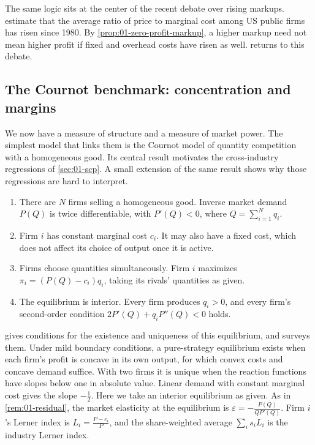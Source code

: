 The same logic sits at the center of the recent debate over rising markups.
\citet{DeLoeckerEeckhoutUnger2020} estimate that the average ratio of price to marginal cost among US public
firms has risen since 1980. By \cref{prop:01-zero-profit-markup}, a higher markup need not mean higher profit if
fixed and overhead costs have risen as well.  returns to this debate.

\subsection{The Cournot benchmark: concentration and margins}\label{sec:01-cournot-hhi}

We now have a measure of structure and a measure of market power. The simplest model that links them is the
Cournot model of quantity competition with a homogeneous good. Its central result motivates the cross-industry
regressions of \cref{sec:01-scp}. A small extension of the same result shows why those regressions are hard to
interpret.

\begin{assumption}\label{ass:01-cournot}
\leavevmode
\begin{enumerate}[label=(\roman*)]
  \item There are $N$ firms selling a homogeneous good. Inverse market demand $P(Q)$ is twice differentiable,
  with $P'(Q) < 0$, where $Q = \sum_{i=1}^{N} q_i$.
  \item Firm $i$ has constant marginal cost $c_i$. It may also have a fixed cost, which does not affect its
  choice of output once it is active.
  \item Firms choose quantities simultaneously. Firm $i$ maximizes $\pi_i = \left(P(Q) - c_i\right) q_i$,
  taking its rivals' quantities as given.
  \item The equilibrium is interior. Every firm produces $q_i > 0$, and every firm's second-order condition
  $2P'(Q) + q_i P''(Q) < 0$ holds.
\end{enumerate}
\end{assumption}

 gives conditions for the existence and uniqueness of this equilibrium, and
\citet[Section~5.7.1]{Tirole1988} surveys them. Under mild boundary conditions, a pure-strategy equilibrium exists
when each firm's profit is concave in its own output, for which convex costs and concave demand suffice. With
two firms it is unique when the reaction functions have slopes below one in absolute value. Linear demand with
constant marginal cost gives the slope $-\frac{1}{2}$. Here we take an interior equilibrium as given. As in \cref{rem:01-residual}, the
market elasticity at the equilibrium is $\varepsilon = -\frac{P(Q)}{Q P'(Q)}$. Firm $i$'s Lerner index is
$L_i = \frac{P - c_i}{P}$, and the share-weighted average $\sum_i s_i L_i$ is the industry Lerner index.

